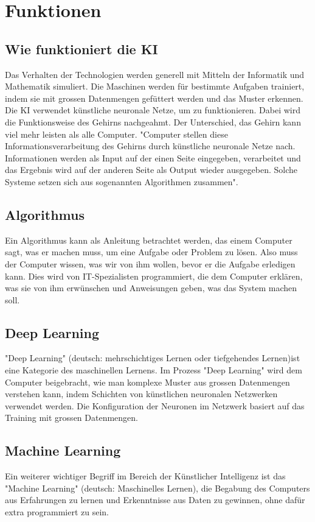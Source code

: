 \chapter{Funktionen}
\label{chap:methode}

\section{Wie funktioniert die KI}
Das Verhalten der Technologien werden generell mit Mitteln der Informatik und Mathematik simuliert. Die Maschinen werden für bestimmte Aufgaben trainiert, indem sie mit grossen Datenmengen gefüttert werden und das Muster erkennen. Die KI verwendet künstliche neuronale Netze, um zu funktionieren. Dabei wird die Funktionsweise des Gehirns nachgeahmt. Der Unterschied, das Gehirn kann viel mehr leisten als alle Computer. "Computer stellen diese Informationsverarbeitung  des Gehirns durch künstliche neuronale Netze nach. Informationen werden als Input auf der einen Seite eingegeben, verarbeitet und das Ergebnis wird auf der anderen Seite als Output wieder ausgegeben. Solche Systeme setzen sich aus sogenannten Algorithmen zusammen"\citep{ai-genius-community}.

\section{Algorithmus}
Ein Algorithmus kann als Anleitung betrachtet werden, das einem Computer sagt, was er machen muss, um eine Aufgabe oder Problem zu lösen. Also muss der Computer wissen, was wir von ihm wollen, bevor er die Aufgabe erledigen kann. Dies wird von IT-Spezialisten programmiert, die dem Computer erklären, was sie von ihm erwünschen und Anweisungen geben, was das System machen soll.

\section{Deep Learning}
"Deep Learning" (deutsch: mehrschichtiges Lernen oder tiefgehendes Lernen)ist eine Kategorie des maschinellen Lernens.
Im Prozess "Deep Learning"   wird dem Computer beigebracht, wie man komplexe Muster aus grossen Datenmengen verstehen kann, indem Schichten von künstlichen neuronalen Netzwerken verwendet werden. Die Konfiguration der Neuronen im Netzwerk basiert auf das Training mit grossen Datenmengen.

\section{Machine Learning}
Ein weiterer wichtiger Begriff im Bereich der Künstlicher Intelligenz ist das "Machine Learning" (deutsch: Maschinelles Lernen), die Begabung des Computers aus Erfahrungen zu lernen und Erkenntnisse aus Daten zu gewinnen, ohne dafür extra programmiert zu sein.